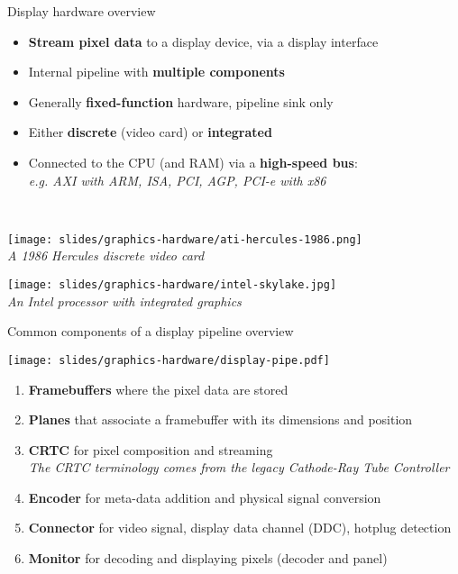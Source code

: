 \begin{frame}{Display hardware overview}
  \begin{itemize}
  \item \textbf{Stream pixel data} to a display device, via a display interface
  \item Internal pipeline with \textbf{multiple components}
  \item Generally \textbf{fixed-function} hardware, pipeline sink only
  \item Either \textbf{discrete} (video card) or \textbf{integrated}
  \item Connected to the CPU (and RAM) via a \textbf{high-speed bus}:\\
  \textit{e.g. AXI with ARM, ISA, PCI, AGP, PCI-e with x86}
  \end{itemize}~

  \begin{minipage}[t]{0.45\textwidth}
    \centering
    \texttt{[image: slides/graphics-hardware/ati-hercules-1986.png]}\\
    \textit{\small A 1986 Hercules discrete video card}
  \end{minipage}
  \hfill
  \begin{minipage}[t]{0.45\textwidth}
    \centering
    \texttt{[image: slides/graphics-hardware/intel-skylake.jpg]}\\
    \textit{\small An Intel processor with integrated graphics}
  \end{minipage}
\end{frame}

\begin{frame}{Common components of a display pipeline overview}
  \begin{center}
  \texttt{[image: slides/graphics-hardware/display-pipe.pdf]}
  \end{center}

  \begin{enumerate}
  \item \textbf{Framebuffers} where the pixel data are stored
  \item \textbf{Planes} that associate a framebuffer with its dimensions and position
  \item \textbf{CRTC} for pixel composition and streaming\\
  \textit{The CRTC terminology comes from the legacy Cathode-Ray Tube Controller}
  \item \textbf{Encoder} for meta-data addition and physical signal conversion
  \item \textbf{Connector} for video signal, display data channel (DDC), hotplug detection
  \item \textbf{Monitor} for decoding and displaying pixels (decoder and panel)
  \end{enumerate}
\end{frame}

